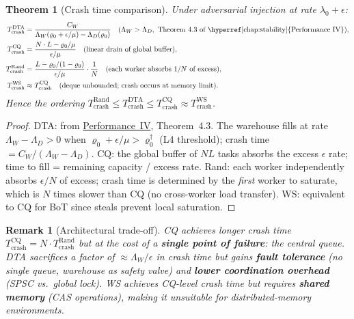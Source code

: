 \documentclass[11pt,a4paper]{article}
\newtheorem{theorem}{Theorem}[section]
\newtheorem{remark}{Remark}[section]
\begin{document}
\begin{theorem}[Crash time comparison]\label{thm:crash_compare}
Under adversarial injection at rate $\lambda_0 + \epsilon$:
\begin{align}
  T_{\mathrm{crash}}^{\mathrm{DTA}} &= \frac{C_W}{\Lambda_W(\varrho_0+\epsilon/\mu) - \Lambda_D(\varrho_0)}
     \quad (\Lambda_W > \Lambda_D, \text{ Theorem~4.3 of \hyperref[chap:stability]{Performance~IV}}),
     \label{eq:T_dta}\\
  T_{\mathrm{crash}}^{\mathrm{CQ}} &= \frac{N \cdot L - \varrho_0/\mu}{\epsilon/\mu}
     \quad (\text{linear drain of global buffer}), \label{eq:T_cq}\\
  T_{\mathrm{crash}}^{\mathrm{Rand}} &= \frac{L - \varrho_0/(1-\varrho_0)}{\epsilon/\mu}
     \cdot \frac{1}{N} \quad (\text{each worker absorbs } 1/N \text{ of excess}),
     \label{eq:T_rand}\\
  T_{\mathrm{crash}}^{\mathrm{WS}} &\approx T_{\mathrm{crash}}^{\mathrm{CQ}}
     \quad (\text{deque unbounded; crash occurs at memory limit}).
     \label{eq:T_ws}
\end{align}
Hence the ordering $T_{\mathrm{crash}}^{\mathrm{Rand}} \le T_{\mathrm{crash}}^{\mathrm{DTA}}
\le T_{\mathrm{crash}}^{\mathrm{CQ}} \approx T_{\mathrm{crash}}^{\mathrm{WS}}$.
\end{theorem}

\begin{proof}
DTA: from \hyperref[chap:stability]{Performance~IV}, Theorem~4.3.  The warehouse fills at rate
$\Lambda_W - \Lambda_D > 0$ when $\varrho_0 + \epsilon/\mu > \varrho_0^\dagger$
(L4 threshold); crash time $= C_W / (\Lambda_W - \Lambda_D)$.
CQ: the global buffer of $NL$ tasks absorbs the excess $\epsilon$ rate;
time to fill = remaining capacity / excess rate.
Rand: each worker independently absorbs $\epsilon/N$ of excess;
crash time is determined by the \emph{first} worker to saturate, which is
$N$ times slower than CQ (no cross-worker load transfer).
WS: equivalent to CQ for BoT since steals prevent local saturation.
\end{proof}

\begin{remark}[Architectural trade-off]
CQ achieves longer crash time $T_{\mathrm{crash}}^{\mathrm{CQ}} = N \cdot T_{\mathrm{crash}}^{\mathrm{Rand}}$
but at the cost of a \textbf{single point of failure}: the central queue.
DTA sacrifices a factor of $\approx \Lambda_W/\epsilon$ in crash time
but gains \textbf{fault tolerance} (no single queue, warehouse as safety valve)
and \textbf{lower coordination overhead} (SPSC vs.\ global lock).
WS achieves CQ-level crash time but requires \textbf{shared memory}
(CAS operations), making it unsuitable for distributed-memory environments.
\end{remark}
\end{document}
